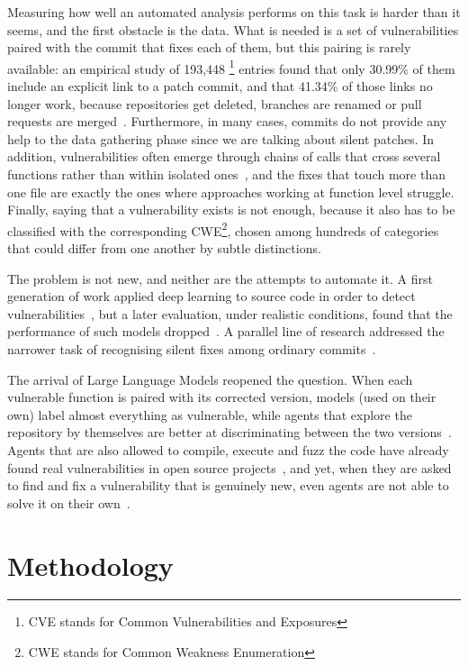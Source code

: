     Measuring how well an automated analysis performs on this task is harder than it seems, and the
    first obstacle is the data.
    What is needed is a set of vulnerabilities paired with the commit that fixes each of them, but
    this pairing is rarely available: an empirical study of 193,448 \footnote{CVE stands for Common Vulnerabilities and Exposures} entries found that only
    30.99\% of them include an explicit link to a patch commit, and that 41.34\% of those links no
    longer work, because repositories get deleted, branches are renamed or pull requests are
    merged~\cite{gitpatchdb2026}.
    Furthermore, in many cases, commits do not provide any help to the data gathering phase since we are
     talking about silent patches.
    In addition, vulnerabilities often emerge through chains of calls that cross several
    functions rather than within isolated ones~\cite{yildiz2025jitvul}, 
    and the fixes that touch more than one file are exactly the ones where approaches 
    working at function level struggle.
    Finally, saying that a vulnerability exists is not enough, because it also has to be classified
    with the corresponding CWE\footnote{CWE stands for Common Weakness Enumeration}, chosen among hundreds of categories 
    that could differ from one another by subtle distinctions.

    The problem is not new, and neither are the attempts to automate it.
    A first generation of work applied deep learning to source code in order to detect
    vulnerabilities~\cite{vuldeepecker2018}, but a later evaluation, under realistic conditions,
    found that the performance of such models dropped~\cite{reveal2022}.
    A parallel line of research addressed the narrower task of recognising silent fixes among
    ordinary commits~\cite{colefunda2023}.

    The arrival of Large Language Models reopened the question.
    When each vulnerable function is paired with its corrected version, models (used on their
    own) label almost everything as vulnerable, while agents that explore the repository by
    themselves are better at discriminating between the two versions~\cite{yildiz2025jitvul}.
    Agents that are also allowed to compile, execute and fuzz the code have already found real
    vulnerabilities in open source projects~\cite{fuzzingbrain2026}, and yet, when they are asked
    to find and fix a vulnerability that is genuinely new, even agents are not able to solve it on their own~\cite{zerodaybench2026}.
    

\section[Methodology]{Methodology}


